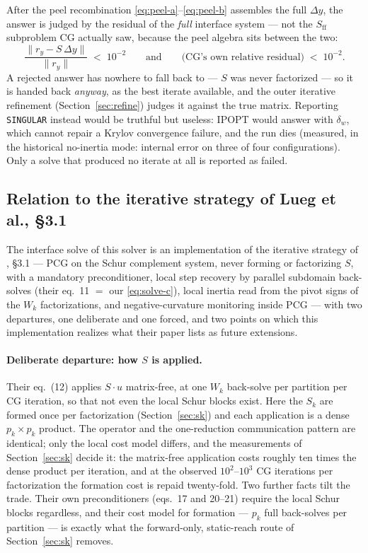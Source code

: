 \documentclass[11pt]{article}
\newcommand{\code}[1]{\texttt{#1}}
\newcommand{\Sff}{S_{\mathrm{ff}}}
\begin{document}
After the peel recombination \eqref{eq:peel-a}--\eqref{eq:peel-b} assembles
the full $\Delta y$, the answer is judged by the residual of the \emph{full}
interface system --- not the $\Sff$ subproblem CG actually saw, because the
peel algebra sits between the two:
\[
  \frac{\|r_y - S\,\Delta y\|}{\|r_y\|} \;<\; 10^{-2}
  \qquad\text{and}\qquad
  \text{(CG's own relative residual)} \;<\; 10^{-2}.
\]
A rejected answer has nowhere to fall back to --- $S$ was never factorized
--- so it is handed back \emph{anyway}, as the best iterate available, and
the outer iterative refinement (Section~\ref{sec:refine}) judges it against
the true matrix.  Reporting \code{SINGULAR} instead would be truthful but
useless: IPOPT would answer with $\delta_w$, which cannot repair a Krylov
convergence failure, and the run dies (measured, in the historical
no-inertia mode: internal error on three of four configurations).  Only a
solve that produced no iterate at all is reported as failed.

\subsection{Relation to the iterative strategy of Lueg et al., \S 3.1}
\label{sec:lueg-audit}

The interface solve of this solver is an implementation of the iterative
strategy of \cite{lueg2025}, \S 3.1 --- PCG on the Schur complement system,
never forming or factorizing $S$, with a mandatory preconditioner, local step
recovery by parallel subdomain back-solves (their eq.~11 $=$ our
\eqref{eq:solve-c}), local inertia read from the pivot signs of the $W_k$
factorizations, and negative-curvature monitoring inside PCG --- with two
departures, one deliberate and one forced, and two points on which this
implementation realizes what their paper lists as future extensions.

\paragraph{Deliberate departure: how $S$ is applied.}
Their eq.~(12) applies $S\cdot u$ matrix-free, at one $W_k$ back-solve per
partition per CG iteration, so that not even the local Schur blocks exist.
Here the $S_k$ are formed once per factorization (Section~\ref{sec:sk}) and
each application is a dense $p_k\times p_k$ product.  The operator and the
one-reduction communication pattern are identical; only the local cost model
differs, and the measurements of Section~\ref{sec:sk} decide it: the
matrix-free application costs roughly ten times the dense product per
iteration, and at the observed $10^2$--$10^3$ CG iterations per factorization
the formation cost is repaid twenty-fold.  Two further facts tilt the trade.
Their own preconditioners (eqs.~17 and 20--21) require the local Schur blocks
regardless, and their cost model for formation --- $p_k$ full back-solves per
partition --- is exactly what the forward-only, static-reach route of
Section~\ref{sec:sk} removes.
\end{document}
